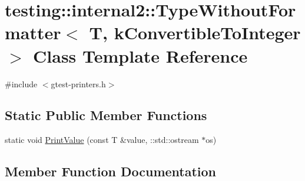 \hypertarget{classtesting_1_1internal2_1_1TypeWithoutFormatter_3_01T_00_01kConvertibleToInteger_01_4}{}\section{testing\+:\+:internal2\+:\+:Type\+Without\+Formatter$<$ T, k\+Convertible\+To\+Integer $>$ Class Template Reference}
\label{classtesting_1_1internal2_1_1TypeWithoutFormatter_3_01T_00_01kConvertibleToInteger_01_4}


{\ttfamily \#include $<$gtest-\/printers.\+h$>$}

\subsection*{Static Public Member Functions}
\begin{DoxyCompactItemize}
\item 
static void \hyperlink{classtesting_1_1internal2_1_1TypeWithoutFormatter_3_01T_00_01kConvertibleToInteger_01_4_ab27a411afb608e730a57d232b3f4f486}{Print\+Value} (const T \&value, \+::std\+::ostream $\ast$os)
\end{DoxyCompactItemize}


\subsection{Member Function Documentation}
\mbox{\label{classtesting_1_1internal2_1_1TypeWithoutFormatter_3_01T_00_01kConvertibleToInteger_01_4_ab27a411afb608e730a57d232b3f4f486}} 
